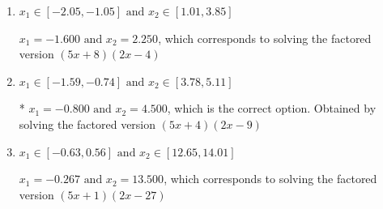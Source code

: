 \documentclass{extbook}[14pt]
\begin{document}
\begin{enumerate}
{\begin{enumerate}[label=\Alph*.]
$x_1 = -4.000 \text{ and } x_2 = 0.900$, which corresponds to solving the factored version $(x + 4)(10x -9)$
\item \( x_1 \in [-2.05, -1.05] \text{ and } x_2 \in [1.01, 3.85] \)

$x_1 = -1.600 \text{ and } x_2 = 2.250$, which corresponds to solving the factored version $(5x + 8)(2x -4)$
\item \( x_1 \in [-1.59, -0.74] \text{ and } x_2 \in [3.78, 5.11] \)

* $x_1 = -0.800 \text{ and } x_2 = 4.500$, which is the correct option. Obtained by solving the factored version $(5x + 4)(2x -9)$
\item \( x_1 \in [-0.63, 0.56] \text{ and } x_2 \in [12.65, 14.01] \)

$x_1 = -0.267 \text{ and } x_2 = 13.500$, which corresponds to solving the factored version $(5x + 1)(2x -27)$
\end{enumerate}

}
\end{enumerate}
\end{document}
